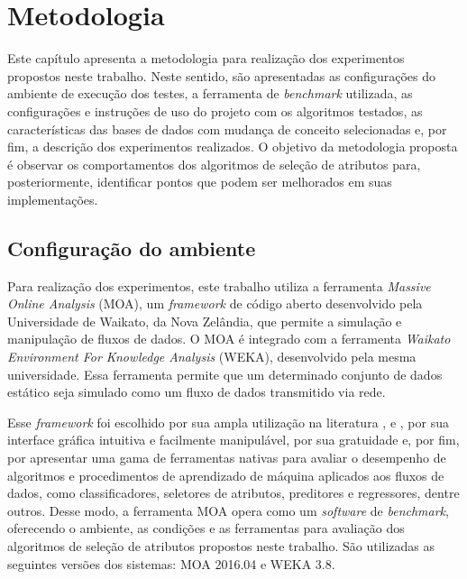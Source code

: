 \chapter{Metodologia}\label{chp:metodologia}

Este capítulo apresenta a metodologia para realização dos experimentos propostos neste trabalho. Neste sentido, são apresentadas as configurações do ambiente de execução dos testes, a ferramenta de \textit{benchmark} utilizada, as configurações e instruções de uso do projeto com os algoritmos testados, as características das bases de dados com mudança de conceito selecionadas e, por fim, a descrição dos experimentos realizados.
O objetivo da metodologia proposta é observar os comportamentos dos algoritmos de seleção de atributos para, posteriormente, identificar pontos que podem ser melhorados em suas implementações.

\section{Configuração do ambiente}\label{sec:met_config_amb}

Para realização dos experimentos, este trabalho utiliza a ferramenta \textit{Massive Online Analysis} (MOA),  
um \textit{framework} 
de código aberto
desenvolvido pela Universidade de Waikato, da Nova Zelândia, que permite a simulação e manipulação de fluxos de dados. O MOA é integrado com a ferramenta 
\textit{Waikato Environment For Knowledge Analysis}
(WEKA), 
desenvolvido pela mesma universidade. Essa ferramenta permite que um determinado conjunto de dados estático seja simulado como um fluxo de dados transmitido via rede. 

Esse \textit{framework} foi escolhido por sua ampla utilização na literatura \cite{Bifet2010}, \cite{Turkov2016} e \cite{Ramirez-Gallego2017},
por
sua interface gráfica intuitiva e facilmente manipulável, por
sua gratuidade e, por fim, por apresentar uma gama de ferramentas nativas para avaliar o desempenho de algoritmos e procedimentos de aprendizado de máquina aplicados 
aos
fluxos de dados, como classificadores, seletores de atributos, preditores e regressores, dentre outros. Desse modo, a ferramenta MOA opera como um \textit{software} de \textit{benchmark}, oferecendo o ambiente, 
as
condições e 
as
ferramentas para avaliação dos algoritmos de seleção de atributos propostos neste trabalho. São utilizadas as seguintes versões dos sistemas: MOA 
2016.04 e WEKA 
3.8.

